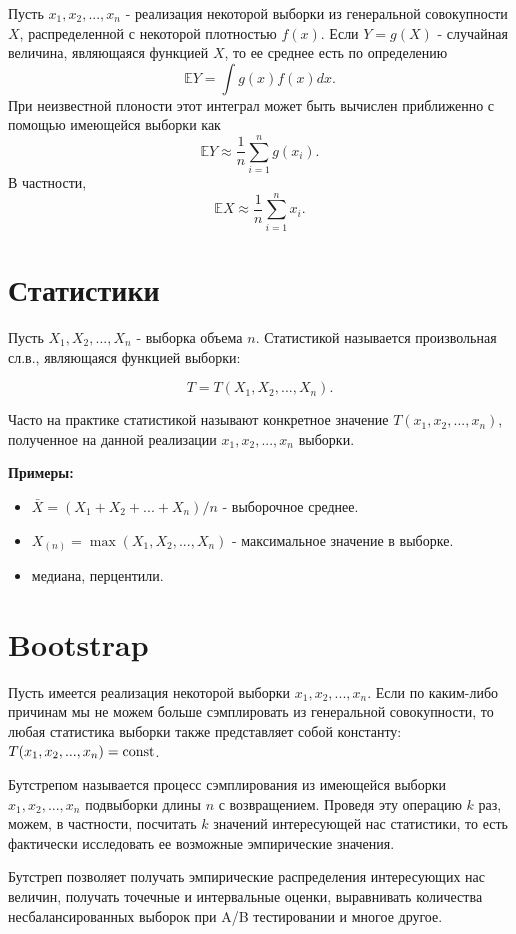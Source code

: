 Пусть $x_1, x_2, ..., x_n$ - реализация некоторой выборки из генеральной совокупности $X$, распределенной с некоторой плотностью $f(x)$. Если $Y = g(X)$ - случайная величина, являющаяся функцией $X$, то ее среднее есть по определению
$$
\mathbb{E}Y = \int g(x)f(x)dx.
$$
При неизвестной плоности этот интеграл может быть вычислен приближенно с помощью имеющейся выборки как
$$
\mathbb{E}Y \approx \frac{1}{n}\sum_{i=1}^ng(x_i).
$$
В частности,
$$
\mathbb{E}X \approx \frac{1}{n}\sum_{i=1}^nx_i.
$$


\section{Статистики}

Пусть $X_1, X_2, ..., X_n$ - выборка объема $n$. Статистикой называется произвольная сл.в., являющаяся функцией выборки:

$$
T = T(X_1, X_2, ..., X_n).
$$

Часто на практике статистикой называют конкретное значение $T(x_1, x_2, ..., x_n)$, полученное на данной реализации $x_1, x_2, ..., x_n$ выборки.

\textbf{Примеры:}
\begin{itemize}
    \item $\bar{X} = (X_1 + X_2 + ... + X_n)/n$ - выборочное среднее.
    \item $X_{(n)} = \max(X_1, X_2, ..., X_n)$ - максимальное значение в выборке.
    \item медиана, перцентили.
\end{itemize}


\section{Bootstrap}

Пусть имеется реализация некоторой выборки $x_1, x_2, ..., x_n$. Если по каким-либо причинам мы не можем больше сэмплировать из генеральной совокупности, то любая статистика выборки также представляет собой константу: $T(x_1, x_2, ..., x_n) = \operatorname*{const}$. 

Бутстрепом называется процесс сэмплирования из имеющейся выборки $x_1, x_2, ..., x_n$ подвыборки длины $n$ с возвращением. Проведя эту операцию $k$ раз, можем, в частности, посчитать $k$ значений интересующей нас статистики, то есть фактически исследовать ее возможные эмпирические значения.

Бутстреп позволяет получать эмпирические распределения интересующих нас величин, получать точечные и интервальные оценки, выравнивать количества несбалансированных выборок при A/B тестировании и многое другое.

